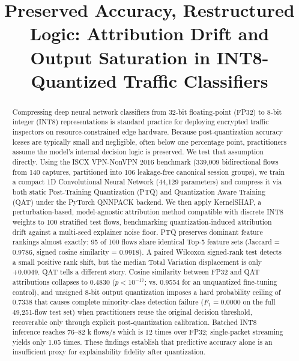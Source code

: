 \documentclass[conference]{IEEEtran}
\begin{document}
\title{Preserved Accuracy, Restructured Logic: Attribution Drift and Output Saturation in INT8-Quantized Traffic Classifiers}

\author{
}

\maketitle

\begin{abstract}
Compressing deep neural network classifiers from 32-bit floating-point (FP32) to 8-bit integer (INT8) representations is standard practice for deploying encrypted traffic inspectors on resource-constrained edge hardware. Because post-quantization accuracy losses are typically small and negligible, often below one percentage point, practitioners assume the model's internal decision logic is preserved. We test that assumption directly. Using the ISCX VPN-NonVPN 2016 benchmark (339,009 bidirectional flows from 140 captures, partitioned into 106 leakage-free canonical session groups), we train a compact 1D Convolutional Neural Network (44,129 parameters) and compress it via both static Post-Training Quantization (PTQ) and Quantization Aware Training (QAT) under the PyTorch QNNPACK backend. We then apply KernelSHAP, a perturbation-based, model-agnostic attribution method compatible with discrete INT8 weights to 100 stratified test flows, benchmarking quantization-induced attribution drift against a multi-seed explainer noise floor. PTQ preserves dominant feature rankings almost exactly: 95 of 100 flows share identical Top-5 feature sets (Jaccard = 0.9786, signed cosine similarity = 0.9918). A paired Wilcoxon signed-rank test detects a small positive rank shift, but the median Total Variation displacement is only +0.0049. QAT tells a different story. Cosine similarity between FP32 and QAT attributions collapses to 0.4830 ($p < 10^{-17}$; vs. 0.9554 for an unquantized fine-tuning control), and unsigned 8-bit output quantization imposes a hard probability ceiling of 0.7338 that causes complete minority-class detection failure ($F_1 = 0.0000$ on the full 49,251-flow test set) when practitioners reuse the original decision threshold, recoverable only through explicit post-quantization calibration. Batched INT8 inference reaches 76--82 k flows/s which is 12 times over FP32; single-packet streaming yields only 1.05 times. These findings establish that predictive accuracy alone is an insufficient proxy for explainability fidelity after quantization.
\end{abstract}
\end{document}
